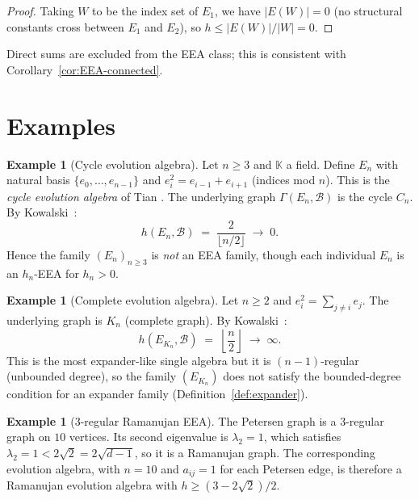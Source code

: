 \documentclass[12pt,a4paper]{amsart}
\theoremstyle{definition}
\newtheorem{example}[theorem]{Example}
\newcommand{\K}{\mathbb{K}}
\newcommand{\hh}{h}          %
\newcommand{\EA}{E}          %
\newcommand{\natbasis}{\mathcal{B}}  %
\begin{document}
\begin{proof}
Taking $W$ to be the index set of $\EA_1$, we have $|E(W)|=0$
(no structural constants cross between $\EA_1$ and $\EA_2$), so
$\hh\le|E(W)|/|W|=0$.
\end{proof}

Direct sums are excluded from the EEA class; this is consistent with Corollary~\ref{cor:EEA-connected}.

\section{Examples}\label{sec:examples}

\begin{example}[Cycle evolution algebra]\label{ex:cycle}
Let $n\ge 3$ and $\K$ a field.  Define $\EA_n$ with natural basis
$\{e_0,\ldots,e_{n-1}\}$ and $e_i^2=e_{i-1}+e_{i+1}$ (indices mod $n$).
This is the \emph{cycle evolution algebra} of Tian \cite{Tian2008}.
The underlying graph $\varGamma(\EA_n,\natbasis)$ is the cycle $C_n$.
By Kowalski~\cite[Example~3.1.3(2)]{Kowalski2019}:
\[
  \hh(\EA_n,\natbasis) \;=\; \frac{2}{\lfloor n/2\rfloor} \;\to\; 0.
\]
Hence the family $(\EA_n)_{n\ge 3}$ is \emph{not} an EEA family, though
each individual $\EA_n$ is an $\hh_n$-EEA for $\hh_n>0$.
\end{example}

\begin{example}[Complete evolution algebra]\label{ex:complete}
Let $n\ge 2$ and $e_i^2=\sum_{j\ne i} e_j$.  The underlying graph is
$K_n$ (complete graph).  By Kowalski~\cite[Example~3.1.3(1)]{Kowalski2019}:
\[
  \hh(\EA_{K_n},\natbasis) \;=\; \left\lfloor \frac{n}{2}\right\rfloor
  \;\to\; \infty.
\]
This is the most expander-like single algebra but it is $(n-1)$-regular
(unbounded degree), so the family $(\EA_{K_n})$ does not satisfy the
bounded-degree condition for an expander family (Definition~\ref{def:expander}).
\end{example}

\begin{example}[$3$-regular Ramanujan EEA]\label{ex:Ramanujan-3reg}
The Petersen graph is a $3$-regular graph on $10$ vertices.
Its second eigenvalue is $\lambda_2=1$, which satisfies $\lambda_2=1<2\sqrt{2}=2\sqrt{d-1}$,
so it is a Ramanujan graph.  The corresponding evolution algebra, with $n=10$ and
$a_{ij}=1$ for each Petersen edge, is therefore a Ramanujan evolution algebra with
$\hh\ge(3-2\sqrt{2})/2$.
\end{example}
\end{document}
